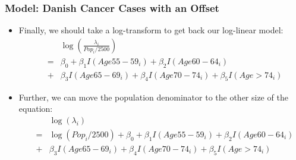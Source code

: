 \documentclass[10pt,xcolor={svgnames},t]{beamer}
\begin{document}
\begin{frame}
	\frametitle{Model: Danish Cancer Cases with an Offset}
	
	\begin{itemize}
		
		\item Finally, we should take a log-transform to get back our log-linear model: 	
		\begin{eqnarray*}
			&&\log(\frac{\lambda_i}{Pop_i /2500} ) \\
			&=&\beta_0 +\beta_1 I(Age55-59_i)+\beta_2 I(Age60-64_i) \\
			&+&\beta_3 I(Age65-69_i)+\beta_4 I(Age70-74_i)+\beta_5 I(Age>74_i)
		\end{eqnarray*} 
		
		\item Further, we can move the population denominator to the other size of the equation:
		\begin{eqnarray*}
			&&\log(\lambda_i ) \\
			&=& \log(Pop_i/2500) + \beta_0 +\beta_1 I(Age55-59_i)+\beta_2 I(Age60-64_i) \\
			&+&\beta_3 I(Age65-69_i)+\beta_4 I(Age70-74_i)+\beta_5 I(Age>74_i) 
		\end{eqnarray*} 
	\end{itemize}
	
	
\end{frame}
%
\end{document}
